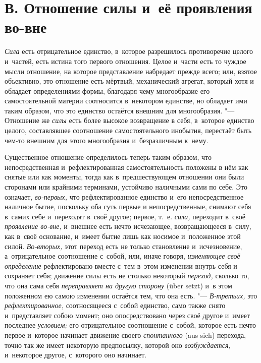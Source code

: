 \section[В. Отношение силы и~её проявления во-вне]
{В. Отношение силы и~её проявления во-вне}

{\em Сила} есть
отрицательное единство, в~которое разрешилось противоречие целого и~частей,
есть истина того первого отношения. Целое и~части есть то чуждое мысли
отношение, на которое представление набредает прежде всего; или, взятое
объективно, это отношение есть мёртвый, механический агрегат, который хотя
и обладает определениями формы, благодаря чему многообразие его
самостоятельной материи соотносится в~некотором единстве, но обладает ими
таким образом, что это единство остаётся внешним для многообразия. "---
Отношение же {\em силы} есть более высокое возвращение
в себя, в~которое единство целого, составлявшее соотношение
самостоятельного инобытия, перестаёт быть чем-то внешним для этого
многообразия и~безразличным к~нему.

Существенное отношение определилось теперь таким образом, что
непосредственная и~рефлектированная самостоятельность положены в
нём
как снятые или как моменты, тогда как в~предшествующем отношении они были
сторонами или крайними терминами, устойчиво наличными сами по себе. Это
означает, {\em во-первых,} что рефлектированное
единство и~его непосредственное наличное бытие, поскольку оба суть первые и
непосредственные, снимают себя в~самих себе и~переходят в~своё другое;
первое, т.~е. {\em сила,} переходит в~своё
{\em проявление во-вне,} и~внешнее есть нечто
исчезающее, возвращающееся в~силу, как в~своё основание, и~имеет бытие лишь
как носимое и~положенное этой силой. {\em Во-вторых,}
этот переход есть не только становление и~исчезновение, а~отрицательное
соотношение с~собой, или, иначе говоря, {\em изменяющее
своё определение} рефлектировано вместе с~тем в~этом изменении внутрь себя
и сохраняет себя; движение силы есть не столько некоторый
{\em переход,} сколько то, что она сама себя
{\em переправляет на другую сторону} (über setzt) и~в
этом положенном ею самою изменении остаётся тем, что она есть. "---
{\em В-третьих,} это {\em рефлектированное,} соотносящееся с~собой единство,
само также снято и~представляет собою момент; оно опосредствовано через
своё другое и~имеет последнее {\em условием;} его
отрицательное соотношение с~собой, которое есть нечто первое и~которое
начинает движение своего {\em спонтанного} (aus sich) перехода,
точно так же имеет некоторую предпосылку, которой оно
{\em возбуждается,} и~некоторое другое, с~которого оно начинает.


